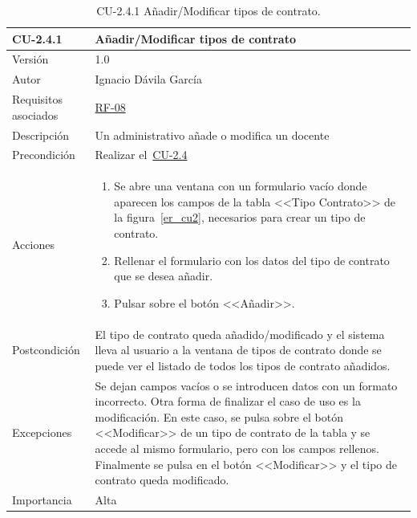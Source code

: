 \begin{table}[p]
	\centering
	\begin{tabularx}{\linewidth}{ p{} p{} }
		\toprule
		\textbf{CU-2.4.1}    & \textbf{Añadir/Modificar tipos de contrato}\\
		\toprule
		{\small Versión}              & 1.0    \\
		{\small Autor}                & Ignacio Dávila García \\
		{\small Requisitos asociados} & \hyperref[itm:RF8]{RF-08} \\
		{\small Descripción}          & Un administrativo añade o modifica un docente \\
		{\small Precondición}         & Realizar el~\hyperref[table:CU-2_4]{CU-2.4} \\
		{\small Acciones}             &
		\begin{enumerate}
			\def\labelenumi{\arabic{enumi}.}
			\tightlist
			\item Se abre una ventana con un formulario vacío donde aparecen los campos de la tabla <<Tipo Contrato>> de la figura~\ref{er_cu2}, necesarios para crear un tipo de contrato.
			\item Rellenar el formulario con los datos del tipo de contrato que se desea añadir.
			\item Pulsar sobre el botón <<Añadir>>.
		\end{enumerate}\\
		{\small Postcondición}        & El tipo de contrato queda añadido/modificado y el sistema lleva al usuario a la ventana de tipos de contrato donde se puede ver el listado de todos los tipos de contrato añadidos. \\
		{\small Excepciones}          & Se dejan campos vacíos o se introducen datos con un formato incorrecto. Otra forma de finalizar el caso de uso es la modificación. En este caso, se pulsa sobre el botón <<Modificar>> de un tipo de contrato de la tabla y se accede al mismo formulario, pero con los campos rellenos. Finalmente se pulsa en el botón <<Modificar>> y el tipo de contrato queda modificado. \\
		{\small Importancia}          & Alta \\
		\bottomrule
	\end{tabularx}
	\caption{CU-2.4.1 Añadir/Modificar tipos de contrato.}\label{table:CU-2_4_1}
\end{table}
\FloatBarrier

